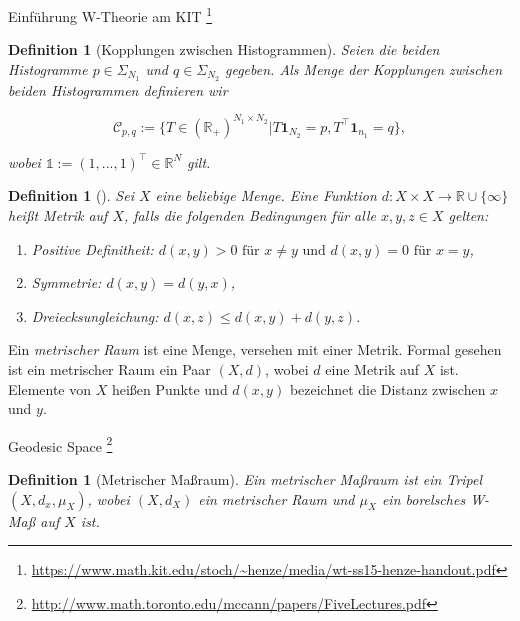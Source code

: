 \documentclass[11pt,a4paper]{article}
\def\emph#1{\textit{#1}}
\newtheorem{definition}[theorem]{Definition}
\numberwithin{equation}{section}
\begin{document}
	
	Einführung W-Theorie am KIT \footnote{\url{https://www.math.kit.edu/stoch/~henze/media/wt-ss15-henze-handout.pdf}}
	\begin{definition}[Kopplungen zwischen Histogrammen]
		Seien die beiden Histogramme $p \in \Sigma_{N_1}$ und $q \in \Sigma_{N_2}$ gegeben.
		Als Menge der Kopplungen zwischen beiden Histogrammen definieren wir
		
		\begin{equation*}
		\mathcal{C}_{p,q} := \lbrace T \in (\mathbb{R}_+)^{N_1 \times N_2} | T \boldsymbol{1}_{N_2} = p, T^\top \boldsymbol{1}_{n_1} = q \rbrace,
		\end{equation*}	
		
		wobei $\mathbb{1} := (1,...,1)^\top \in \mathbb{R}^{N}$ gilt.
	\end{definition}
	
	
	
	\begin{definition}[\cite{burago2001course}]
		Sei $X$ eine beliebige Menge. Eine Funktion $d:X \times X \to \mathbb{R} \cup \lbrace \infty \rbrace$ heißt \emph{Metrik} auf $X$, falls die folgenden Bedingungen für alle $x,y,z \in X$ gelten:
		\begin{enumerate}[label={(\arabic*)}]
			\item Positive Definitheit: $d(x,y) > 0 \text{ für } x \neq y \text{ und } d(x,y)=0 \text{ für } x=y$,
			\item Symmetrie: $d(x,y)=d(y,x)$,
			\item Dreiecksungleichung: $d(x,z) \leq d(x,y) + d(y,z)$.	
		\end{enumerate}
	\end{definition}
	Ein \emph{metrischer Raum} ist eine Menge, versehen mit einer Metrik. Formal gesehen ist ein metrischer Raum ein Paar $(X,d)$, wobei $d$ eine Metrik auf $X$ ist. Elemente von $X$ heißen Punkte und $d(x,y)$ bezeichnet die Distanz zwischen $x$ und $y$.
	
	
	
	
	
	Geodesic Space \footnote{\url{http://www.math.toronto.edu/mccann/papers/FiveLectures.pdf}}
	
	
	
	
	\begin{definition}[Metrischer Maßraum]
		Ein \emph{metrischer Maßraum} ist ein Tripel $(X,d_x,\mu_X)$, wobei $(X,d_X)$ ein metrischer Raum und $\mu_X$ ein borelsches W-Maß auf $X$ ist.
	\end{definition}
	
\end{document}
